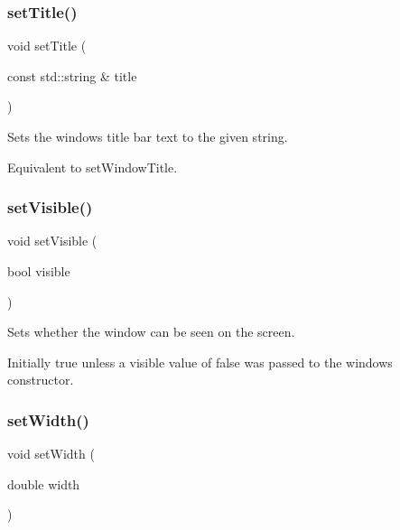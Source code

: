\subsubsection{\texorpdfstring{set\+Title()}{setTitle()}}
{\footnotesize\ttfamily void set\+Title (\begin{DoxyParamCaption}\item[{const std\+::string \&}]{title }\end{DoxyParamCaption})\hspace{0.3cm}{\ttfamily [virtual]}}



Sets the window\textquotesingle{}s title bar text to the given string. 

Equivalent to set\+Window\+Title. \mbox{\label{classsgl_1_1GWindow_a18e44e30b31525a243960ca3928125aa}} 
\subsubsection{\texorpdfstring{set\+Visible()}{setVisible()}}
{\footnotesize\ttfamily void set\+Visible (\begin{DoxyParamCaption}\item[{bool}]{visible }\end{DoxyParamCaption})\hspace{0.3cm}{\ttfamily [virtual]}}



Sets whether the window can be seen on the screen. 

Initially true unless a visible value of false was passed to the window\textquotesingle{}s constructor. \mbox{\label{classsgl_1_1GWindow_aa3f3fba4cb131baa8696ba01e3bceca1}} 
\subsubsection{\texorpdfstring{set\+Width()}{setWidth()}}
{\footnotesize\ttfamily void set\+Width (\begin{DoxyParamCaption}\item[{double}]{width }\end{DoxyParamCaption})\hspace{0.3cm}{\ttfamily [virtual]}}



